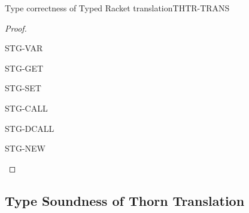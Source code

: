 \documentclass[acmlarge, anonymous, authordraft]{acmart}
\begin{document}
\begin{lemma}{Type correctness of Typed Racket translation}{THTR-TRANS}
  \begin{conds}
    \cond{$\TR\K = \Kp$}
    \cond{$\TR\Env = \Envp$}
  \end{conds}

  \then\axiom{$\EnvType\Envp\cdot\Kp{\TRG{\e}\Env}{\t}$}

  \begin{proof} \indmsg{\EnvTypeW\Env\K\e\t}

    \begin{case}{STG-VAR}    
    \end{case}

    \begin{case}{STG-GET}
    \end{case}

    \begin{case}{STG-SET}
    \end{case}

    \begin{case}{STG-CALL}
    \end{case}

    \begin{case}{STG-DCALL}
    \end{case}

    \begin{case}{STG-NEW}
    \end{case}
  \end{proof}
\end{lemma}

\subsection{Type Soundness of Thorn Translation}
\end{document}
